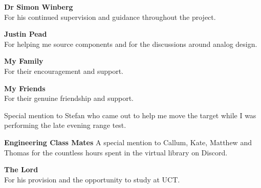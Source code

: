 \textbf{Dr Simon Winberg}\\
For his continued supervision and guidance throughout the project.

\textbf{Justin Pead}\\
For helping me source components and for the discussions around analog design.

\textbf{My Family}\\
For their encouragement and support.

\textbf{My Friends}\\
For their genuine friendship and support.

Special mention to Stefan who came out to help me move the target while I was performing the late evening range test.

\textbf{Engineering Class Mates}
A special mention to Callum, Kate, Matthew and Thomas for the countless hours spent in the virtual library on Discord.

\textbf{The Lord}\\
For his provision and the opportunity to study at UCT.


